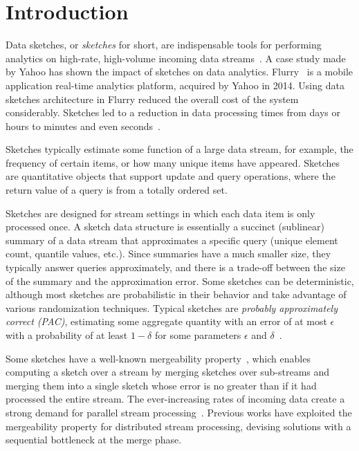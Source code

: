 \chapter{Introduction}
\label{chap:intro}

Data sketches, or \emph{sketches} for short, are indispensable tools for performing analytics on high-rate, high-volume incoming data streams~\cite{KDD_tutorial}. A case study made by Yahoo has shown the impact of sketches on data analytics. Flurry~\cite{flurry} is a mobile application real-time analytics platform, acquired by Yahoo in 2014. Using data sketches architecture in Flurry reduced the overall cost of the system considerably. Sketches led to a reduction in data processing times from days or hours to minutes and even seconds~\cite{flurry_case}.


Sketches typically estimate some function of a large data stream, for example, the frequency of certain items, or how many unique items have appeared. Sketches are quantitative objects that support update and query operations, where the return value of a query is from a totally ordered set. 


Sketches are designed for stream settings in which each data item is only processed once. A sketch data structure is essentially a succinct (sublinear) summary of a data stream that approximates a specific query (unique element count, quantile values, etc.). Since summaries have a much smaller size, they typically answer queries approximately, and there is a trade-off between the size of the summary and the approximation error. Some sketches can be deterministic, although most sketches are probabilistic in their behavior and take advantage of various randomization techniques. Typical sketches are \emph{probably approximately correct (PAC)}, estimating some aggregate quantity with an error of at most $\epsilon$ with a probability of at least $1-\delta$ for some parameters $\epsilon$ and $\delta$~\cite{mergeables_summaries, Cormode2011SketchTechniques, Rinberg_2020_fast_sketches, Zhao2021KLLPlus}.


Some sketches have a well-known mergeability property~\cite{mergeables_summaries}, which enables computing a sketch over a stream by merging sketches over sub-streams and merging them into a single sketch whose error is no greater than if it had processed the entire stream. The ever-increasing rates of incoming data create a strong demand for parallel stream processing~\cite{Cormode_2011_disributed_monitoring, Heule_2013_cardinality_est}. Previous works have exploited the mergeability property for distributed stream processing, devising solutions with a sequential bottleneck at the merge phase.


